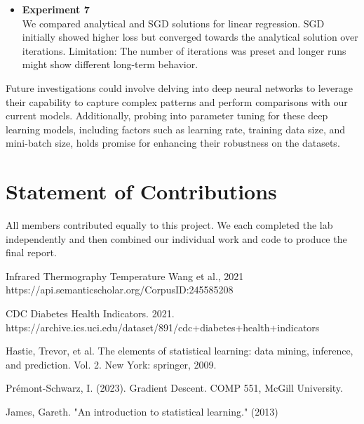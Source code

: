\documentclass{article}
\begin{document}
\begin{itemize}
  \item \textbf{Experiment 7} \\
    We compared analytical and SGD solutions for linear regression. SGD initially showed higher loss but converged towards the analytical solution over iterations. Limitation: The number of iterations was preset and longer runs might show different long-term behavior.

\end{itemize}

Future investigations could involve delving into deep neural networks to leverage their capability to capture complex patterns and perform comparisons with our current models. Additionally, probing into parameter tuning for these deep learning models, including factors such as learning rate, training data size, and mini-batch size, holds promise for enhancing their robustness on the datasets.



\section{Statement of Contributions}

All members contributed equally to this project. We each completed the lab independently and then combined our individual work and code to produce the final report.

\newpage
  

\begin{thebibliography}{1}

 Infrared Thermography Temperature
Wang et al., 2021
https://api.semanticscholar.org/CorpusID:245585208
\label{ref:dataset1}

 CDC Diabetes Health Indicators. 2021. https://archive.ics.uci.edu/dataset/891/cdc+diabetes+health+indicators \label{ref:dataset2}

 Hastie, Trevor, et al. The elements of statistical learning: data mining, inference, and prediction. Vol. 2. New York: springer, 2009. \label{statistical learning}

 Prémont-Schwarz, I. (2023). Gradient Descent. COMP 551, McGill University.\label{ref:lectures}

 James, Gareth. "An introduction to statistical learning." (2013) \label{ref:validation}

\end{thebibliography}
\end{document}
